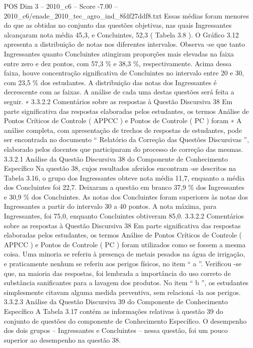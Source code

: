 \begin{textsample}{POS Dim 3 – 2010\_c6 – Score -7.00 – 2010\_c6/enade\_2010\_tec\_agro\_ind\_8fdf27ddf8.txt}
Essas médias foram menores do que as obtidas no conjunto das questões objetivas, nas quais Ingressantes alcançaram nota média 45,3, e Concluintes, 52,3 ( Tabela 3.8 ).
O Gráfico 3.12 apresenta a distribuição de notas nos diferentes intervalos.
Observa -se que tanto Ingressantes quanto Concluintes atingiram proporções mais elevadas na faixa entre zero e dez pontos, com 57,3 \% e 38,3 \%, respectivamente.
Acima dessa faixa, houve concentração significativa de Concluintes no intervalo entre 20 e 30, com 23,5 \% dos estudantes.
A distribuição das notas dos Ingressantes é decrescente com as faixas.
A análise de cada uma destas questões será feita a seguir. ∗ 3.3.2.2 Comentários sobre as respostas à Questão Discursiva 38 Em parte significativa das respostas elaboradas pelos estudantes, os termos Análise de Pontos Críticos de Controle ( APPCC ) e Pontos de Controle ( PC ) foram ∗ A análise completa, com apresentação de trechos de respostas de estudantes, pode ser encontrada no documento “ Relatório da Correção das Questões Discursivas ”, elaborado pelos docentes que participaram do processo de correção das mesmas. 3.3.2.1 Análise da Questão Discursiva 38 do Componente de Conhecimento Específico Na questão 38, cujos resultados aferidos encontram -se descritos na Tabela 3.16, o grupo dos Ingressantes obteve nota média 11,7, enquanto a média dos Concluintes foi 22,7.
Deixaram a questão em branco 37,9 \% dos Ingressantes e 30,9 \% dos Concluintes.
As notas dos Concluintes foram superiores às notas dos Ingressantes a partir do intervalo 30 a 40 pontos.
A nota máxima, para Ingressantes, foi 75,0, enquanto Concluintes obtiveram 85,0. 3.3.2.2 Comentários sobre as respostas à Questão Discursiva 38 Em parte significativa das respostas elaboradas pelos estudantes, os termos Análise de Pontos Críticos de Controle ( APPCC ) e Pontos de Controle ( PC ) foram utilizados como se fossem a mesma coisa.
Uma minoria se referiu à presença de metais pesados na água de irrigação, e praticamente nenhum se referiu aos perigos físicos, no item “ a ”.
Verificou -se que, na maioria das respostas, foi lembrada a importância do uso correto de substância sanificantes para a lavagem dos produtos.
No item “ b ”, os estudantes simplesmente citavam alguma medida preventiva, sem relacioná -la aos perigos. 3.3.2.3 Análise da Questão Discursiva 39 do Componente de Conhecimento Específico A Tabela 3.17 contém as informações relativas à questão 39 do conjunto de questões do componente de Conhecimento Específico.
O desempenho dos dois grupos – Ingressantes e Concluintes – nessa questão, foi um pouco superior ao desempenho na questão 38.

\end{textsample}
